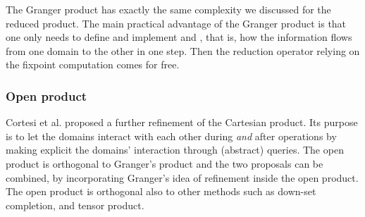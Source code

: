 \documentclass[submission,copyright,creativecommons]{eptcs}
\begin{document}
The Granger product has exactly the same complexity we discussed for the reduced product. The main practical advantage of the Granger product is that one only needs to define and implement  and , that is, how the information flows from one domain to the other in one step. Then the reduction operator relying on the fixpoint computation comes for free. 



\subsubsection{Open product}

Cortesi et al. \cite{CCH00} proposed a further refinement of the Cartesian product. Its purpose is to let the domains interact with each other during \emph{and} after operations by making explicit the domains' interaction through (abstract) queries. The open product is orthogonal to Granger's product and the two proposals can be combined, by incorporating Granger's idea of refinement inside the open product. The open product is orthogonal also to other methods such as down-set completion, and tensor product.
\end{document}
